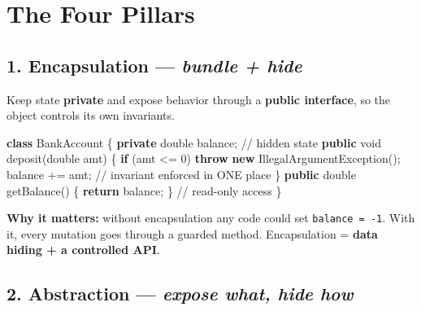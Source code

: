 \documentclass[11pt]{article}
\newenvironment{Shaded}{\begin{snugshade}}{\end{snugshade}}
\newcommand{\BuiltInTok}[1]{\textcolor[rgb]{0.50,0.55,0.55}{#1}}
\newcommand{\CommentTok}[1]{\textcolor[rgb]{0.48,0.49,0.49}{#1}}
\newcommand{\ControlFlowTok}[1]{\textcolor[rgb]{0.99,0.74,0.29}{\textbf{#1}}}
\newcommand{\DataTypeTok}[1]{\textcolor[rgb]{0.16,0.50,0.73}{#1}}
\newcommand{\DecValTok}[1]{\textcolor[rgb]{0.96,0.45,0.00}{#1}}
\newcommand{\FunctionTok}[1]{\textcolor[rgb]{0.56,0.27,0.68}{#1}}
\newcommand{\KeywordTok}[1]{\textcolor[rgb]{0.81,0.81,0.76}{\textbf{#1}}}
\newcommand{\NormalTok}[1]{\textcolor[rgb]{0.81,0.81,0.76}{#1}}
\newcommand{\OperatorTok}[1]{\textcolor[rgb]{0.81,0.81,0.76}{#1}}
\begin{document}
\section{The Four Pillars}\label{the-four-pillars}


\subsection{\texorpdfstring{1. Encapsulation --- \emph{bundle + hide}}{1. Encapsulation --- bundle + hide}}\label{1-encapsulation--bundle--hide}

Keep state \textbf{private} and expose behavior through a \textbf{public interface}, so the object controls its own invariants.


\begin{Shaded}
\begin{Highlighting}[]
\KeywordTok{class}\NormalTok{ BankAccount }\OperatorTok{\{}
    \KeywordTok{private} \DataTypeTok{double}\NormalTok{ balance}\OperatorTok{;}                  \CommentTok{// hidden state}
    \KeywordTok{public} \DataTypeTok{void} \FunctionTok{deposit}\OperatorTok{(}\DataTypeTok{double}\NormalTok{ amt}\OperatorTok{)} \OperatorTok{\{}
        \ControlFlowTok{if} \OperatorTok{(}\NormalTok{amt }\OperatorTok{\textless{}=} \DecValTok{0}\OperatorTok{)} \ControlFlowTok{throw} \KeywordTok{new} \BuiltInTok{IllegalArgumentException}\OperatorTok{();}
\NormalTok{        balance }\OperatorTok{+=}\NormalTok{ amt}\OperatorTok{;}                      \CommentTok{// invariant enforced in ONE place}
    \OperatorTok{\}}
    \KeywordTok{public} \DataTypeTok{double} \FunctionTok{getBalance}\OperatorTok{()} \OperatorTok{\{} \ControlFlowTok{return}\NormalTok{ balance}\OperatorTok{;} \OperatorTok{\}}   \CommentTok{// read{-}only access}
\OperatorTok{\}}
\end{Highlighting}
\end{Shaded}

\textbf{Why it matters:} without encapsulation any code could set \texttt{balance\ =\ -1}. With it, every mutation goes through a guarded method. Encapsulation = \textbf{data hiding + a controlled API}.

\subsection{\texorpdfstring{2. Abstraction --- \emph{expose what, hide how}}{2. Abstraction --- expose what, hide how}}\label{2-abstraction--expose-what-hide-how}
\end{document}
